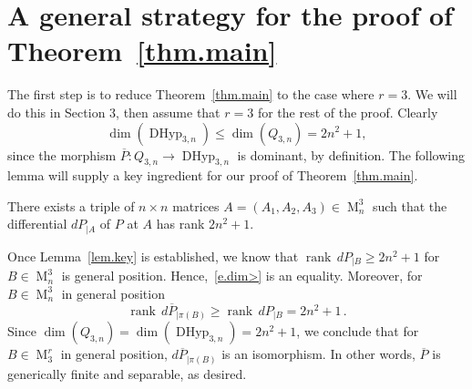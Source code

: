 \documentclass[12pt]{amsart}
\numberwithin{equation}{section}
\numberwithin{subsection}{section}
\theoremstyle{definition} \newtheorem{definition}[theorem]{Definition}
\newcommand\DHyp{\operatorname{DHyp}}
\newcommand{\Mat}{\operatorname{M}}
\newcommand{\rank}{\operatorname{rank}}
\begin{document}
 
\section{A general strategy for the proof of Theorem~\ref{thm.main}}
\label{sect.strategy}

The first step is to reduce Theorem~\ref{thm.main}
to the case where $r = 3$. We will do this in Section 3, then
assume that $r = 3$ for the rest of the proof.  Clearly 
\begin{equation} \label{e.dim>}
\dim(\DHyp_{3, n}) \leqslant \dim(Q_{3, n}) = 2n^2 + 1,
\end{equation}
since the morphism $\overline{P} \colon Q_{3, n} \to \DHyp_{3, n}$ is
dominant, by definition. The following lemma will supply a key ingredient 
for our proof of Theorem~\ref{thm.main}.

\begin{lemma} \label{lem.key}
There exists a triple of $n \times n$ matrices $A = (A_1, A_2, A_3)
\in \Mat_n^3$ such that the differential $dP_{|A}$ of $P$ at $A$ has
rank $2n^2 + 1$. 
\end{lemma}

Once Lemma~\ref{lem.key} is established, we know that 
$\rank \, dP_{|B} \geqslant 2n^2 + 1$ 
for $B \in \Mat_n^3$ is general position. Hence,~\eqref{e.dim>} 
is an equality.  Moreover, for $B \in \Mat_n^3$ 
in general position 
\[ \rank \, d \overline{P}_{|\pi(B)} \geqslant
\rank \, d P_{| B} = 2n^2 + 1 \, .  \]
Since $\dim(Q_{3, n}) = \dim(\DHyp_{3, n}) = 2n^2 + 1$,
we conclude that for $B \in \Mat_3^r$ in general position,
$d\overline{P}_{|\pi(B)}$ is an isomorphism. In other words,
$\overline{P}$ is generically finite and separable, as desired.
\end{document}
